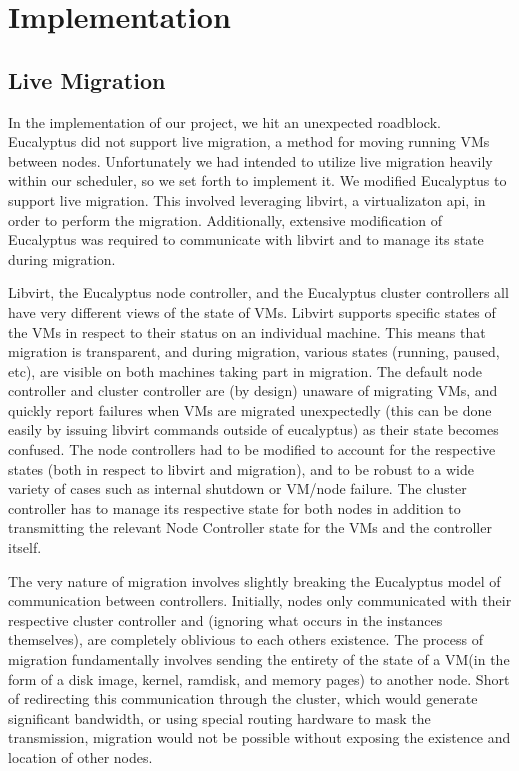 \section{Implementation}

\subsection{Live Migration}

In the implementation of our project, we hit an unexpected roadblock.  Eucalyptus did not support live migration, a method for moving running VMs between nodes.  Unfortunately we had intended to utilize live migration heavily within our scheduler, so we set forth to implement it.  We modified Eucalyptus to support live migration.  This involved leveraging libvirt, a virtualizaton api, in order to perform the migration.  Additionally, extensive modification of Eucalyptus was required to communicate with libvirt and to manage its state during migration.  

Libvirt, the Eucalyptus node controller, and the Eucalyptus cluster controllers all have very different views of the state of VMs.  Libvirt supports specific states of the VMs in respect to their status on an individual machine. This means that migration is transparent, and during migration, various states (running, paused, etc), are visible on both machines taking part in migration.  The default node controller and cluster controller are (by design) unaware of migrating VMs, and quickly report failures when VMs are migrated unexpectedly (this can be done easily by issuing libvirt commands outside of eucalyptus) as their state becomes confused.  The node controllers had to be modified to account for the respective states (both in respect to libvirt and migration), and to be robust to a wide variety of cases such as internal shutdown or VM/node failure.  The cluster controller has to manage its respective state for both nodes in addition to transmitting the relevant Node Controller state for the VMs and the controller itself.  

The very nature of migration involves slightly breaking the Eucalyptus model of communication between controllers.  Initially, nodes only communicated with their respective cluster controller and (ignoring what occurs in the instances themselves), are completely oblivious to each others existence.  The process of migration fundamentally involves sending the entirety of the state of a VM(in the form of a disk image, kernel, ramdisk, and memory pages) to another node.  Short of redirecting this communication through the cluster, which would generate significant bandwidth, or using special routing hardware to mask the transmission, migration would not be possible without exposing the existence and location of other nodes.


